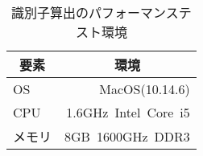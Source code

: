 \begin{table}[h]
 \caption{識別子算出のパフォーマンステスト環境}
 \centering
  \begin{tabular}{lr}
    \toprule
		\multicolumn{1}{c}{\textbf{要素}} & \multicolumn{1}{c}{\textbf{環境}} \\
    \midrule
		OS & MacOS(10.14.6) \\
		CPU & 1.6GHz\ Intel\ Core\ i5 \\
		メモリ & 8GB\ 1600GHz\ DDR3 \\
    \bottomrule
  \end{tabular}
 \label{tab:overhead-test}
\end{table}
